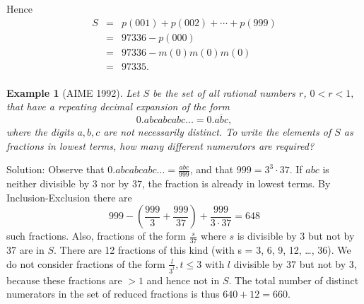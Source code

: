 \documentclass[11pt, openany]{book}
\theoremstyle{change} \theoremheaderfont{\blue\sffamily\bfseries}
\newtheorem{exa}[thm]{Example}
\theoremstyle{nonumberplain} \theoremheaderfont{\sffamily\bfseries}
\newcommand{\dis}{\displaystyle}
\newcommand{\í}{\'{\i}}
\begin{document}
Hence$$ \begin{array}{lll} S &  = & p(001) + p(002) + \cdots +
p(999)\\
 & = &  97336 - p(000)\\
 & = & 97336 - m(0)m(0)m(0)\\
 & = &  97335.\\
 \end{array}$$

\begin{exa}[AIME 1992] Let $S$ be the set of all rational numbers $r$, $0 < r < 1,$
that have a repeating decimal expansion of the form
$$0.abcabcabc\ldots = 0.\overline{abc},$$where the digits $a, b, c$ are not necessarily distinct. To
write the elements of $S$ as fractions in lowest terms, how many
different numerators are required?
\end{exa}
Solution: Observe that $0.abcabcabc\ldots = \dis{\frac{abc}{999}}$,
and that $999 = 3^3\cdot 37.$ If $abc$ is neither divisible by $3$
nor by $37$, the fraction is already in lowest terms. By
Inclusion-Exclusion there are
$$999 - \left(\frac{999}{3} + \frac{999}{37}\right) + \frac{999}{3\cdot 37} = 648$$
such fractions. Also, fractions of the form $\dis{\frac{s}{37}}$
where  $s$ is divisible by $3$ but not by $37$ are in $S$. There are
12 fractions of this kind (with s = 3, 6, 9, 12, \ldots , 36). We do
not consider fractions of the form $\dis{\frac{l}{3^t}, t \leq 3}$
with $l$ divisible by $37$ but not by $3$, because these fractions
are $> 1$ and hence not in $S$. The total number of distinct
numerators in the set of reduced fractions is thus $640 + 12 = 660.$

\clearpage
\end{document}
